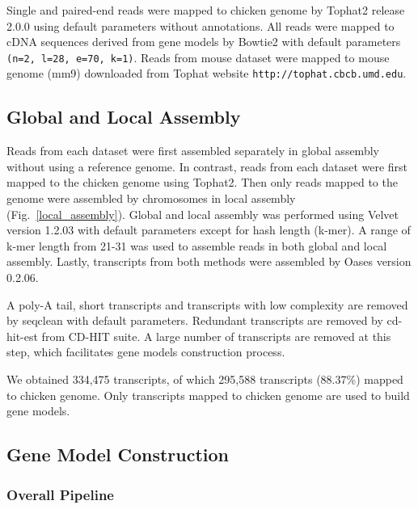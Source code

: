 \documentclass[10pt]{article}
\begin{document}
Single and paired-end reads were mapped to chicken genome by Tophat2\cite{Trapnell:2009dp} release 2.0.0 using
default parameters without annotations.
All reads were mapped to cDNA sequences derived from gene models by Bowtie2\cite{Langmead:2009fv} with
default parameters \texttt{(n=2, l=28, e=70, k=1)}.
Reads from mouse dataset were mapped to mouse genome (mm9) downloaded from Tophat website \texttt{http://tophat.cbcb.umd.edu}.

\subsection*{Global and Local Assembly}

Reads from each dataset were first assembled separately in global assembly without using a reference genome.
In contrast, reads from each dataset were first mapped to the chicken genome using Tophat2.
Then only reads mapped to the genome were assembled by chromosomes in local assembly (Fig.~\ref{local_assembly}).
Global and local assembly was performed using Velvet version 1.2.03\cite{Zerbino:2008vu}
with default parameters except for hash length (k-mer).
A range of k-mer length from 21-31 was used to assemble reads in both global and local assembly.
Lastly, transcripts from both methods were assembled by Oases version 0.2.06\cite{Schulz:2012je}.

A poly-A tail, short transcripts and transcripts with low complexity are removed by
seqclean\cite{seqclean} with default parameters.
Redundant transcripts are removed by cd-hit-est from CD-HIT suite\cite{Li:2006hr}.
A large number of transcripts are removed at this step, which facilitates gene models construction process.

We obtained 334,475 transcripts, of which 295,588 transcripts (88.37\%) mapped to chicken genome.
Only transcripts mapped to chicken genome are used to build gene models.

\subsection*{Gene Model Construction}

\subsubsection*{Overall Pipeline}
\end{document}
